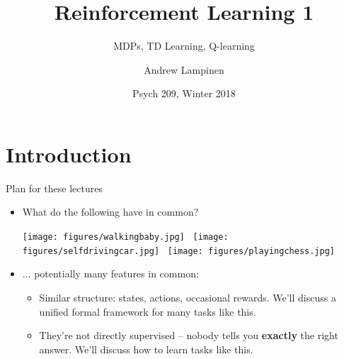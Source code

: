 \documentclass{beamer}
\begin{document}
\title{Reinforcement Learning 1}
\subtitle{MDPs, TD Learning, Q-learning}
\author{Andrew Lampinen}
\date{Psych 209, Winter 2018}
\frame{\titlepage}


\section{Introduction}
\begin{frame}{Plan for these lectures}
\begin{itemize}
    \item What do the following have in common?
    \begin{center}
        \texttt{[image: figures/walkingbaby.jpg]}~
        \texttt{[image: figures/selfdrivingcar.jpg]}~
        \texttt{[image: figures/playingchess.jpg]}
    \end{center}
    \item<2-> ... potentially many features in common:
    \begin{itemize} 
        \item<3-> Similar structure: states, actions, occasional rewards. We'll discuss a unified formal framework for many tasks like this. 
        \item<4-> They're not directly supervised -- nobody tells you \textbf{exactly} the right answer. We'll discuss how to learn tasks like this. 
    \end{itemize}
    
\end{itemize}
\end{frame}
\end{document}
